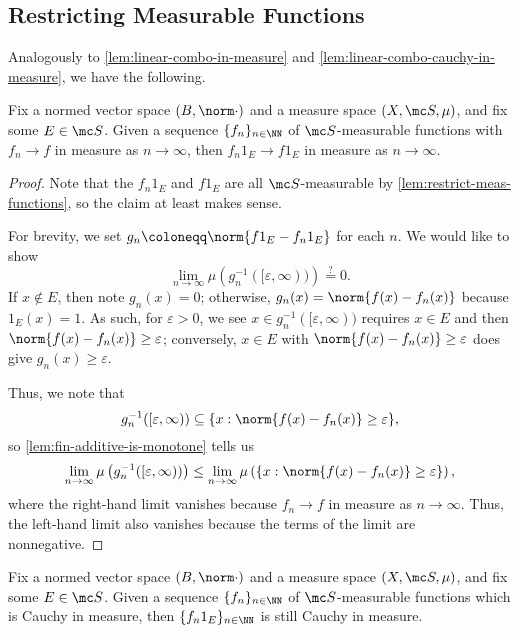 \documentclass[../notes.tex]{subfiles}
\begin{document}
\subsection{Restricting Measurable Functions}
Analogously to \autoref{lem:linear-combo-in-measure} and \autoref{lem:linear-combo-cauchy-in-measure}, we have the following.
\begin{lemma} \label{lem:restrict-converge-in-measure}
	Fix a normed vector space $(B,\norm\cdot)$ and a measure space $(X,\mc S,\mu)$, and fix some $E\in\mc S$. Given a sequence $\{f_n\}_{n\in\NN}$ of $\mc S$-measurable functions with $f_n\to f$ in measure as $n\to\infty$, then $f_n1_E\to f1_E$ in measure as $n\to\infty$.
\end{lemma}
\begin{proof}
	Note that the $f_n1_E$ and $f1_E$ are all $\mc S$-measurable by \autoref{lem:restrict-meas-functions}, so the claim at least makes sense.

	For brevity, we set $g_n\coloneqq\norm{f1_E-f_n1_E}$ for each $n$. We would like to show
	\[\lim_{n\to\infty}\mu\left(g_n^{-1}([\varepsilon,\infty))\right)\stackrel?=0.\]
	If $x\notin E$, then note $g_n(x)=0$; otherwise, $g_n(x)=\norm{f(x)-f_n(x)}$ because $1_E(x)=1$. As such, for $\varepsilon>0$, we see $x\in g_n^{-1}([\varepsilon,\infty))$ requires $x\in E$ and then $\norm{f(x)-f_n(x)}\ge\varepsilon$; conversely, $x\in E$ with $\norm{f(x)-f_n(x)}\ge\varepsilon$ does give $g_n(x)\ge\varepsilon$.

	Thus, we note that
	\[g_n^{-1}([\varepsilon,\infty))\subseteq\{x:\norm{f(x)-f_n(x)}\ge\varepsilon\},\]
	so \autoref{lem:fin-additive-is-monotone} tells us
	\[\lim_{n\to\infty}\mu\left(g_n^{-1}([\varepsilon,\infty))\right)\le\lim_{n\to\infty}\mu\left(\{x:\norm{f(x)-f_n(x)}\ge\varepsilon\}\right),\]
	where the right-hand limit vanishes because $f_n\to f$ in measure as $n\to\infty$. Thus, the left-hand limit also vanishes because the terms of the limit are nonnegative.
\end{proof}
\begin{lemma}
	Fix a normed vector space $(B,\norm\cdot)$ and a measure space $(X,\mc S,\mu)$, and fix some $E\in\mc S$. Given a sequence $\{f_n\}_{n\in\NN}$ of $\mc S$-measurable functions which is Cauchy in measure, then $\{f_n1_E\}_{n\in\NN}$ is still Cauchy in measure.
\end{lemma}
\end{document}

